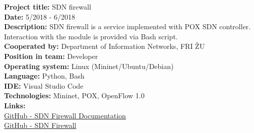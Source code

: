 \documentclass[slovak]{article}
\begin{document}
\noindent
\textbf{Project title:} SDN firewall\\
\textbf{Date:} 5/2018 - 6/2018\\
\textbf{Description:} SDN firewall is a service implemented with POX SDN controller. Interaction with the module is provided via Bash script.\\
\textbf{Cooperated by:} Department of Information Networks, FRI ŽU\\
\textbf{Position in team:} Developer\\
\textbf{Operating system:} Linux (Mininet/Ubuntu/Debian)\\
\textbf{Language:} Python, Bash\\
\textbf{IDE:} Visual Studio Code\\
\textbf{Technologies:} Mininet, POX, OpenFlow 1.0\\
\textbf{Links:}\\
\href{https://github.com/kyberdrb/FRI/tree/master/Ing/4.semester/Integracia\_Sieti/semestralka}{GitHub - SDN Firewall Documentation}\\
\href{https://github.com/kyberdrb/sdnfirewall}{GitHub - SDN Firewall}
\end{document}
